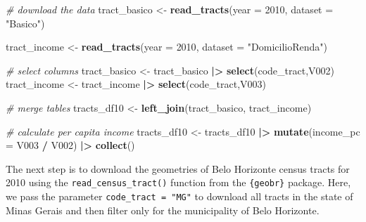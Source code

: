 \documentclass[
]{article}
\newenvironment{Shaded}{\begin{snugshade}}{\end{snugshade}}
\newcommand{\AttributeTok}[1]{\textcolor[rgb]{0.13,0.29,0.53}{#1}}
\newcommand{\CommentTok}[1]{\textcolor[rgb]{0.56,0.35,0.01}{\textit{#1}}}
\newcommand{\DecValTok}[1]{\textcolor[rgb]{0.00,0.00,0.81}{#1}}
\newcommand{\FunctionTok}[1]{\textcolor[rgb]{0.13,0.29,0.53}{\textbf{#1}}}
\newcommand{\NormalTok}[1]{#1}
\newcommand{\OtherTok}[1]{\textcolor[rgb]{0.56,0.35,0.01}{#1}}
\newcommand{\SpecialCharTok}[1]{\textcolor[rgb]{0.81,0.36,0.00}{\textbf{#1}}}
\newcommand{\StringTok}[1]{\textcolor[rgb]{0.31,0.60,0.02}{#1}}
\begin{document}
\begin{Shaded}
\begin{Highlighting}[]
\CommentTok{\# download the data}
\NormalTok{tract\_basico }\OtherTok{\textless{}{-}} \FunctionTok{read\_tracts}\NormalTok{(}\AttributeTok{year =} \DecValTok{2010}\NormalTok{,}
                            \AttributeTok{dataset =} \StringTok{"Basico"}\NormalTok{)}

\NormalTok{tract\_income }\OtherTok{\textless{}{-}} \FunctionTok{read\_tracts}\NormalTok{(}\AttributeTok{year =} \DecValTok{2010}\NormalTok{,}
                            \AttributeTok{dataset =} \StringTok{"DomicilioRenda"}\NormalTok{)}

\CommentTok{\# select columns}
\NormalTok{tract\_basico }\OtherTok{\textless{}{-}}\NormalTok{ tract\_basico }\SpecialCharTok{|\textgreater{}} \FunctionTok{select}\NormalTok{(}\StringTok{\textquotesingle{}code\_tract\textquotesingle{}}\NormalTok{,}\StringTok{\textquotesingle{}V002\textquotesingle{}}\NormalTok{)}
\NormalTok{tract\_income }\OtherTok{\textless{}{-}}\NormalTok{ tract\_income }\SpecialCharTok{|\textgreater{}} \FunctionTok{select}\NormalTok{(}\StringTok{\textquotesingle{}code\_tract\textquotesingle{}}\NormalTok{,}\StringTok{\textquotesingle{}V003\textquotesingle{}}\NormalTok{)}

\CommentTok{\# merge tables}
\NormalTok{tracts\_df10 }\OtherTok{\textless{}{-}} \FunctionTok{left\_join}\NormalTok{(tract\_basico, tract\_income)}

\CommentTok{\# calculate per capita income}
\NormalTok{tracts\_df10 }\OtherTok{\textless{}{-}}\NormalTok{ tracts\_df10 }\SpecialCharTok{|\textgreater{}}
                \FunctionTok{mutate}\NormalTok{(}\AttributeTok{income\_pc =}\NormalTok{ V003 }\SpecialCharTok{/}\NormalTok{ V002) }\SpecialCharTok{|\textgreater{}}
                \FunctionTok{collect}\NormalTok{()}
\end{Highlighting}
\end{Shaded}

The next step is to download the geometries of Belo Horizonte census
tracts for 2010 using the \texttt{read\_census\_tract()} function from
the \texttt{\{geobr\}} package. Here, we pass the parameter
\texttt{code\_tract\ =\ "MG"} to download all tracts in the state of
Minas Gerais and then filter only for the municipality of Belo
Horizonte.
\end{document}

